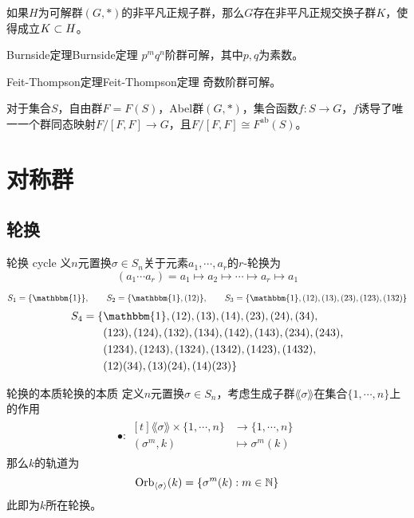\begin{corollary}
	如果$H$为可解群$(G,*)$的非平凡正规子群，那么$G$存在非平凡正规交换子群$K$，使得成立$K\subset H$。
\end{corollary}

\begin{theorem}{Burnside定理}{Burnside定理}
	$p^mq^n$阶群可解，其中$p,q$为素数。
\end{theorem}

\begin{theorem}{Feit-Thompson定理}{Feit-Thompson定理}
	奇数阶群可解。
\end{theorem}

\begin{proposition}
	对于集合$S$，自由群$F=F(S)$，Abel群$(G,*)$，集合函数$f:S\to G$，$f$诱导了唯一一个群同态映射$F/[F,F]\to G$，且$F/[F,F]\cong F^{\mathrm{ab}}(S)$。
\end{proposition}

\section{对称群}

\subsection{轮换}

\begin{definition}{轮换 cycle}
	义$n$元置换$\sigma\in S_n$关于元素$a_1,\cdots,a_r$的$r$-轮换为
	$$  
	(a_1\cdots a_r)=a_1\mapsto a_2 \mapsto\cdots\mapsto a_r \mapsto a_1  
	$$
\end{definition}

\begin{example}
	$$
	S_1=\{\mathbbm{1}\},\qquad S_2=\{\mathbbm{1},(12)\},\qquad S_3=\{ \mathbbm{1},(12),(13),(23),(123),(132) \}
	$$
	\begin{align*}
		S_4=\{ & \mathbbm{1},(12),(13),(14),(23),(24),(34),\\
		& (123),(124),(132),(134),(142),(143),(234),(243),\\
		& (1234),(1243),(1324),(1342),(1423),(1432),\\
		& (12)(34),(13)(24),(14)(23) \}
	\end{align*}
\end{example}

\begin{theorem}{轮换的本质}{轮换的本质}
	定义$n$元置换$\sigma\in S_n$，考虑生成子群$\lang\sigma\rang$在集合$\{1,\cdots, n\}$上的作用
	\begin{align*}
		\bullet:\begin{aligned}[t]
			\lang \sigma \rang\times \{1,\cdots,n\}&\longrightarrow \{1,\cdots,n\}\\
			(\sigma^m,k)&\longmapsto \sigma^m(k)
		\end{aligned}
	\end{align*}
	那么$k$的轨道为
	$$
	\mathrm{Orb}_{\langle \sigma \rangle}(k)=\{ \sigma^m(k):m\in\mathbb{N} \}
	$$
	此即为$k$所在轮换。
\end{theorem}

